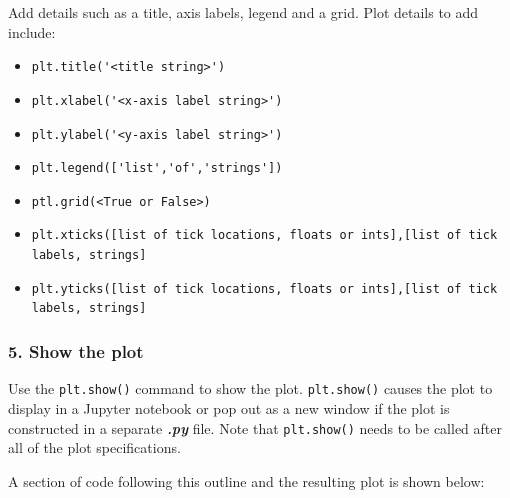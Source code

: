 \documentclass{book}
\providecommand{\tightlist}{%
      \setlength{\itemsep}{0pt}\setlength{\parskip}{0pt}}
\begin{document}
Add details such as a title, axis labels, legend and a grid. Plot
details to add include:

\begin{itemize}
\tightlist
\item
  \lstinline!plt.title('<title string>')!
\item
  \lstinline!plt.xlabel('<x-axis label string>')!
\item
  \lstinline!plt.ylabel('<y-axis label string>')!
\item
  \lstinline!plt.legend(['list','of','strings'])!
\item
  \lstinline!ptl.grid(<True or False>)!
\item
  \lstinline!plt.xticks([list of tick locations, floats or ints],[list of tick labels, strings]!
\item
  \lstinline!plt.yticks([list of tick locations, floats or ints],[list of tick labels, strings]!
\end{itemize}

\subsubsection{5. Show the plot}\label{show-the-plot}

Use the \lstinline!plt.show()! command to show the plot.
\lstinline!plt.show()! causes the plot to display in a Jupyter notebook
or pop out as a new window if the plot is constructed in a separate
\textbf{\emph{.py}} file. Note that \lstinline!plt.show()! needs to be
called after all of the plot specifications.
    




    
        A section of code following this outline and the resulting plot is shown
below:
    
\end{document}
